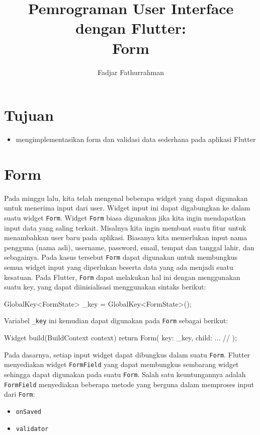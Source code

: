 \documentclass[a4paper,11pt]{article} %
\newcommand{\txtinline}[1]{\texttt{#1}}
\begin{document}
\title{Pemrograman User Interface dengan Flutter:\\
Form}
\author{Fadjar Fathurrahman}
\date{}
\maketitle

\section{Tujuan}

\begin{itemize}
\item mengimplementasikan form dan validasi data sederhana pada aplikasi Flutter
\end{itemize}

\section{Form}
Pada minggu lalu, kita telah mengenal beberapa widget yang dapat digunakan untuk
menerima input dari user. Widget input ini dapat digabungkan ke dalam suatu widget
\txtinline{Form}. Widget \txtinline{Form} biasa digunakan jika kita ingin mendapatkan
input data yang saling terkait. Misalnya kita ingin membuat suatu fitur untuk menambahkan
user baru pada aplikasi. Biasanya kita memerlukan input nama pengguna (nama asli),
username, password, email, tempat dan tanggal lahir, dan sebagainya. Pada kasus tersebut
\txtinline{Form} dapat digunakan untuk membungkus semua widget input yang diperlukan
beserta data yang ada menjadi suatu kesatuan.
Pada Flutter, \txtinline{Form} dapat melakukan hal ini dengan menggunakan suatu
key, yang dapat diinisialisasi menggunakan sintaks berikut:

\begin{dartcode}
GlobalKey<FormState> _key = GlobalKey<FormState>();
\end{dartcode}

Variabel \txtinline{_key} ini kemudian dapat digunakan pada \txtinline{Form}
sebagai berikut:
\begin{dartcode}
Widget build(BuildContext context) {
  return Form(
    key: _key,
    child: ... //
  );
}
\end{dartcode}

Pada dasarnya, setiap input widget dapat dibungkus dalam suatu \txtinline{Form}.
Flutter menyediakan widget \txtinline{FormField} yang dapat membungkus sembarang widget
sehingga dapat digunakan pada suatu \txtinline{Form}. Salah satu keuntungannya adalah
\txtinline{FormField} menyediakan beberapa metode yang berguna dalam memproses input
dari \txtinline{Form}:
\begin{itemize}
\item \txtinline{onSaved}
\item \txtinline{validator}
\end{itemize}
\end{document}
